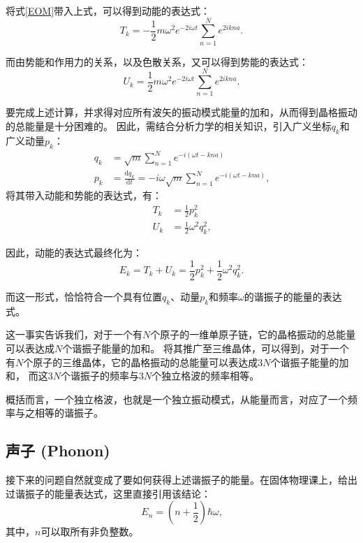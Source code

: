 \documentclass[declarePage]{ecnuthesis}
\begin{document}
将式\ref{EOM}带入上式，可以得到动能的表达式：
\begin{equation}
    T_k=-\frac{1}{2}m\omega^2e^{-2i\omega t}\sum_{n=1}^{N}e^{2ikna} \text{.}
\end{equation}

而由势能和作用力的关系，以及色散关系，又可以得到势能的表达式：
\begin{equation}
    U_k=\frac{1}{2}m\omega^2e^{-2i\omega t}\sum_{n=1}^{N}e^{2ikna} \text{.}
\end{equation}

要完成上述计算，并求得对应所有波矢的振动模式能量的加和，从而得到晶格振动的总能量是十分困难的。%
因此，需结合分析力学的相关知识，引入广义坐标$q_k$和广义动量$p_k$：
\begin{align}
    q_k &= \sqrt{m}\sum_{n=1}^{N}e^{-i(\omega t-kna)} \\
    p_k &= \frac{\mathrm{d}q_k}{\mathrm{d}t} = -i\omega \sqrt{m}\sum_{n=1}^{N}e^{-i(\omega t-kna)} \text{,} 
\end{align}
将其带入动能和势能的表达式，有：
\begin{align}
    T_k &= \frac{1}{2}p_k^2 \\
    U_k &= \frac{1}{2}\omega^2q_k^2 \text{,} 
\end{align}

因此，动能的表达式最终化为：
\begin{equation}
    E_k=T_k+U_k=\frac{1}{2}p_k^2 + \frac{1}{2}\omega^2q_k^2 \text{.} 
\end{equation}

而这一形式，恰恰符合一个具有位置$q_k$、动量$p_k$和频率$\omega$的谐振子的能量的表达式。

这一事实告诉我们，对于一个有$N$个原子的一维单原子链，它的晶格振动的总能量可以表达成$N$个谐振子能量的加和。%
将其推广至三维晶体，可以得到，对于一个有$N$个原子的三维晶体，它的晶格振动的总能量可以表达成3$N$个谐振子能量的加和，%
而这3$N$个谐振子的频率与3$N$个独立格波的频率相等。

概括而言，一个独立格波，也就是一个独立振动模式，从能量而言，对应了一个频率与之相等的谐振子。

\subsection{声子 (Phonon)}

接下来的问题自然就变成了要如何获得上述谐振子的能量。在固体物理课上，给出过谐振子的能量表达式，这里直接引用该结论：
\begin{equation}
    E_n=(n + \frac{1}{2})\hbar \omega \text{,} \label{HO}
\end{equation}
其中，$n$可以取所有非负整数。
\end{document}

